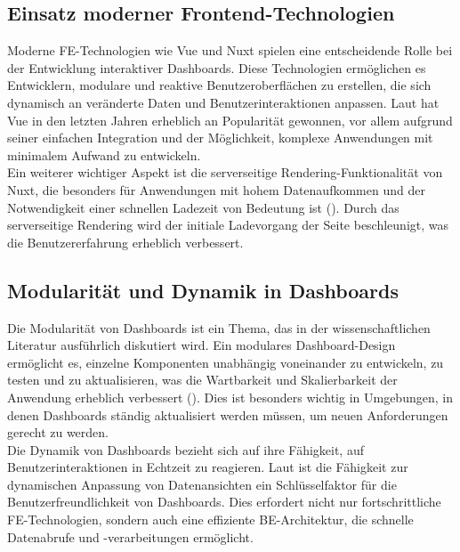 \documentclass[a4paper, 12pt]{scrartcl}
\begin{document}
\subsection{Einsatz moderner Frontend-Technologien}
Moderne \ac{FE}-Technologien wie \ac{Vue} und \ac{Nuxt} spielen eine entscheidende Rolle bei der Entwicklung interaktiver Dashboards. Diese Technologien ermöglichen es Entwicklern, modulare und reaktive Benutzeroberflächen zu erstellen, die sich dynamisch an veränderte Daten und Benutzerinteraktionen anpassen. Laut \textcite{Dabbas2021} hat \ac{Vue} in den letzten Jahren erheblich an Popularität gewonnen, vor allem aufgrund seiner einfachen Integration und der Möglichkeit, komplexe Anwendungen mit minimalem Aufwand zu entwickeln.\\[1em] Ein weiterer wichtiger Aspekt ist die serverseitige Rendering-Funktionalität von \ac{Nuxt}, die besonders für Anwendungen mit hohem Datenaufkommen und der Notwendigkeit einer schnellen Ladezeit von Bedeutung ist (\cite{Bach2022}). Durch das serverseitige Rendering wird der initiale Ladevorgang der Seite beschleunigt, was die Benutzererfahrung erheblich verbessert.
\newpage

\subsection{Modularität und Dynamik in Dashboards}
Die Modularität von Dashboards ist ein Thema, das in der wissenschaftlichen Literatur ausführlich diskutiert wird. Ein modulares Dashboard-Design ermöglicht es, einzelne Komponenten unabhängig voneinander zu entwickeln, zu testen und zu aktualisieren, was die Wartbarkeit und Skalierbarkeit der Anwendung erheblich verbessert (\cite{Ullrich2019}). Dies ist besonders wichtig in Umgebungen, in denen Dashboards ständig aktualisiert werden müssen, um neuen Anforderungen gerecht zu werden.\\[1em]Die Dynamik von Dashboards bezieht sich auf ihre Fähigkeit, auf Benutzerinteraktionen in Echtzeit zu reagieren. Laut \textcite{Toasa2018} ist die Fähigkeit zur dynamischen Anpassung von Datenansichten ein Schlüsselfaktor für die Benutzerfreundlichkeit von Dashboards. Dies erfordert nicht nur fortschrittliche \ac{FE}-Technologien, sondern auch eine effiziente \ac{BE}-Architektur, die schnelle Datenabrufe und -verarbeitungen ermöglicht.
\end{document}
